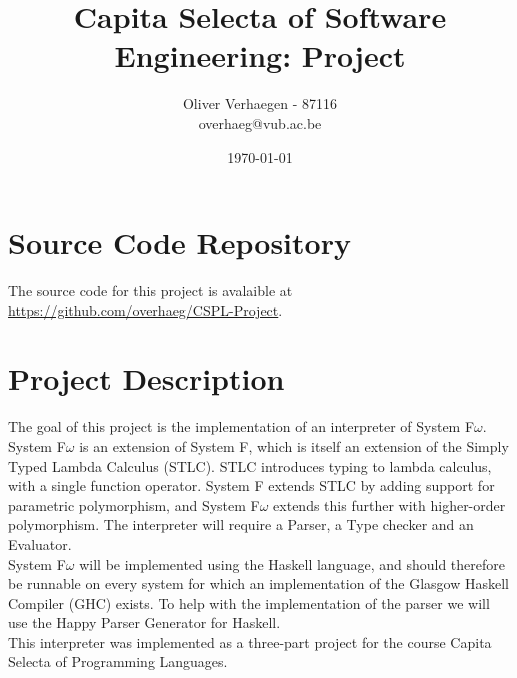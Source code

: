 \documentclass[pdftex,11pt,a4paper]{article}
\author{Oliver Verhaegen - 87116\\
overhaeg@vub.ac.be}
\title{Capita Selecta of Software Engineering: Project}
\date{\today}
\begin{document}
\maketitlepage

\tableofcontents
\clearpage

\section{Source Code Repository}

The source code for this project is avalaible at \url{https://github.com/overhaeg/CSPL-Project}.

\section{Project Description}

The goal of this project is the implementation of an interpreter of System F$\omega$. System F$\omega$ is an extension of System F, which is itself an extension of 
the Simply Typed Lambda Calculus (STLC). STLC introduces typing to lambda calculus, with a single function operator. 
System F extends STLC by adding support for parametric polymorphism, and System F$\omega$ extends this further with higher-order polymorphism. 
The interpreter will require a Parser, a Type checker and an Evaluator.\\
\noindent
System F$\omega$ will be implemented using the Haskell language, and should therefore be runnable on every system for which an implementation of the Glasgow Haskell Compiler (GHC) exists.
To help with the implementation of the parser we will use the Happy Parser Generator for Haskell.\\
This interpreter was implemented as a three-part project for the course Capita Selecta of Programming Languages. 
\end{document}
